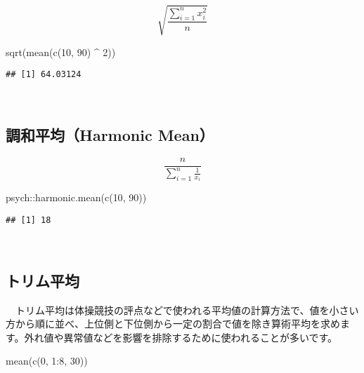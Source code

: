 \documentclass[
  12pt,
]{book}
\newenvironment{Shaded}{\begin{snugshade}}{\end{snugshade}}
\newcommand{\DecValTok}[1]{\textcolor[rgb]{0.00,0.00,0.81}{#1}}
\newcommand{\FunctionTok}[1]{\textcolor[rgb]{0.00,0.00,0.00}{#1}}
\newcommand{\NormalTok}[1]{#1}
\newcommand{\SpecialCharTok}[1]{\textcolor[rgb]{0.00,0.00,0.00}{#1}}
\begin{document}
\[\sqrt{\frac{\sum_{i=1}^n{x_i^2}}{n}}\]

\begin{Shaded}
\begin{Highlighting}[]
\FunctionTok{sqrt}\NormalTok{(}\FunctionTok{mean}\NormalTok{(}\FunctionTok{c}\NormalTok{(}\DecValTok{10}\NormalTok{, }\DecValTok{90}\NormalTok{) }\SpecialCharTok{\^{}} \DecValTok{2}\NormalTok{))}
\end{Highlighting}
\end{Shaded}

\begin{verbatim}
## [1] 64.03124
\end{verbatim}

　

\hypertarget{ux8abfux548cux5e73ux5747harmonic-mean}{%
\subsection*{調和平均（Harmonic Mean）}\label{ux8abfux548cux5e73ux5747harmonic-mean}}

\[\frac{n}{\sum_{i=1}^n{\frac{1}{x_i}}}\]

\begin{Shaded}
\begin{Highlighting}[]
\NormalTok{psych}\SpecialCharTok{::}\FunctionTok{harmonic.mean}\NormalTok{(}\FunctionTok{c}\NormalTok{(}\DecValTok{10}\NormalTok{, }\DecValTok{90}\NormalTok{))}
\end{Highlighting}
\end{Shaded}

\begin{verbatim}
## [1] 18
\end{verbatim}

　

\hypertarget{ux30c8ux30eaux30e0ux5e73ux5747}{%
\subsection*{トリム平均}\label{ux30c8ux30eaux30e0ux5e73ux5747}}

　トリム平均は体操競技の評点などで使われる平均値の計算方法で、値を小さい方から順に並べ、上位側と下位側から一定の割合で値を除き算術平均を求めます。外れ値や異常値などを影響を排除するために使われることが多いです。

\begin{Shaded}
\begin{Highlighting}[]
\FunctionTok{mean}\NormalTok{(}\FunctionTok{c}\NormalTok{(}\DecValTok{0}\NormalTok{, }\DecValTok{1}\SpecialCharTok{:}\DecValTok{8}\NormalTok{, }\DecValTok{30}\NormalTok{))}
\end{Highlighting}
\end{Shaded}
\end{document}
